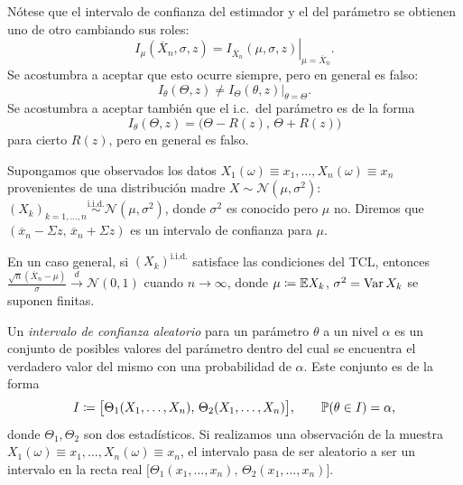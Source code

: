 \begin{observacion}[32]
Nótese que el intervalo de confianza del estimador y el del parámetro se obtienen uno de otro cambiando sus roles:
\[
  I_{\mu}(\overline{X}_n, \sigma, z) = \left.I_{\overline{X}_n}(\mu, \sigma, z)\right|_{\mu = \overline{X}_n}.
\]
Se acostumbra a aceptar que esto ocurre siempre, pero en general es falso:
\[
  I_{\theta}(\Theta, z) \neq \left.I_{\Theta}(\theta, z)\right|_{\theta = \Theta}.
\]
Se acostumbra a aceptar también que el i.c.\ del parámetro es de la forma
\[
  I_{\theta}(\Theta, z) = \bigl(\Theta - R(z),\, \Theta + R(z)\bigr)
\]
para cierto $R(z)$, pero en general es falso.
\end{observacion}

\begin{definicion}
Supongamos que observados los datos $X_1(\omega) \equiv x_1, \dots, X_n(\omega) \equiv x_n$ provenientes de una distribución madre $X \sim \mathcal{N}(\mu, \sigma^2)$: $(X_k)_{k=1,\dots,n} \stackrel{\text{i.i.d.}}{\sim} \mathcal{N}(\mu, \sigma^2)$, donde $\sigma^2$ es conocido pero $\mu$ no. Diremos que $(\overline{x}_n - \Sigma z,\, \overline{x}_n + \Sigma z)$ es un intervalo de confianza para $\mu$.

En un caso general, si $(X_k)^{\text{i.i.d.}}$ satisface las condiciones del TCL, entonces $\frac{\sqrt{n}(\overline{X}_n - \mu)}{\sigma} \xrightarrow{d} \mathcal{N}(0,1)$ cuando $n \to \infty$, donde $\mu \coloneqq \mathbb{E} X_k$, $\sigma^2 = \operatorname{Var} X_k$ se suponen finitas.
\end{definicion}

\begin{definicion}[70]
Un \emph{intervalo de confianza aleatorio} para un parámetro $\theta$ a un nivel $\alpha$ es un conjunto de posibles valores del parámetro dentro del cual se encuentra el verdadero valor del mismo con una probabilidad de $\alpha$. Este conjunto es de la forma
\[
  I \coloneqq \bigl[\Theta_1(X_1, \dots, X_n),\, \Theta_2(X_1, \dots, X_n)\bigr], \qquad \mathbb{P}(\theta \in I) = \alpha,
\]
donde $\Theta_1, \Theta_2$ son dos estadísticos. Si realizamos una observación de la muestra $X_1(\omega) \equiv x_1, \dots, X_n(\omega) \equiv x_n$, el intervalo pasa de ser aleatorio a ser un intervalo en la recta real $\bigl[\Theta_1(x_1, \dots, x_n),\, \Theta_2(x_1, \dots, x_n)\bigr]$.
\end{definicion}

